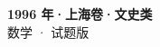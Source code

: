 \documentclass[zihao=-4, a4paper]{ctexart}
\begin{document}
\begin{center}
  {\Large\bfseries 1996 年·上海卷·文史类}\\[4pt]
  {\large 数学 · 试题版}
\end{center}
\medskip
{}

\end{document}

